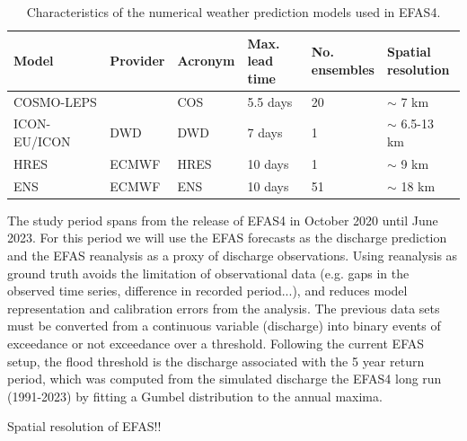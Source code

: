 \documentclass[preprint,12pt,authoryear]{elsarticle}
\begin{document}
\begin{table}
    \centering
    \caption{Characteristics of the numerical weather prediction models used in EFAS4.}
    \footnotesize %
    \begin{tabular}{llllll} 
        \toprule
        Model & Provider & Acronym & \parbox{2cm}{Max.\\ lead time} & \parbox{2cm}{No.\\ ensembles} & \parbox{2cm}{Spatial \\ resolution} \\
        \midrule
        COSMO-LEPS & & COS & 5.5 days & 20 & $\sim$ 7 km \\
        ICON-EU/ICON & DWD & DWD & 7 days & 1 & $\sim$ 6.5-13 km \\
        HRES & ECMWF & HRES & 10 days & 1 & $\sim$ 9 km \\ 
        ENS & ECMWF & ENS & 10 days &  51 & $\sim$ 18 km \\ 
        \bottomrule
    \end{tabular}
    \label{tab:NWP_chars}
\end{table}

The study period spans from the release of EFAS4 in October 2020 until June 2023. For this period we will use the EFAS forecasts as the discharge prediction and the EFAS reanalysis as a proxy of discharge observations. Using reanalysis as ground truth avoids the limitation of observational data (e.g. gaps in the observed time series, difference in recorded period...), and reduces model representation and calibration errors from the analysis. The previous data sets must be converted from a continuous variable (discharge) into binary events of exceedance or not exceedance over a threshold. Following the current EFAS setup, the flood threshold is the discharge associated with the 5 year return period, which was computed from the simulated discharge the EFAS4 long run (1991-2023)  by fitting a Gumbel distribution to the annual maxima.

Spatial resolution of EFAS!!
\end{document}
